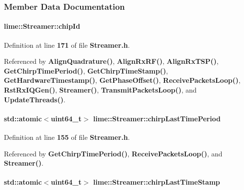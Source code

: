 \subsubsection{Member Data Documentation}
\paragraph[{chip\+Id}]{ lime\+::\+Streamer\+::chip\+Id\hspace{0.3cm}{\ttfamily [private]}}\label{classlime_1_1Streamer_abefd7afb714673aa37ebb56132571e7f}


Definition at line {\bf 171} of file {\bf Streamer.\+h}.



Referenced by {\bf Align\+Quadrature()}, {\bf Align\+Rx\+R\+F()}, {\bf Align\+Rx\+T\+S\+P()}, {\bf Get\+Chirp\+Time\+Period()}, {\bf Get\+Chirp\+Time\+Stamp()}, {\bf Get\+Hardware\+Timestamp()}, {\bf Get\+Phase\+Offset()}, {\bf Receive\+Packets\+Loop()}, {\bf Rst\+Rx\+I\+Q\+Gen()}, {\bf Streamer()}, {\bf Transmit\+Packets\+Loop()}, and {\bf Update\+Threads()}.

\paragraph[{chirp\+Last\+Time\+Period}]{\setlength{\rightskip}{0pt plus 5cm}std\+::atomic$<$uint64\+\_\+t$>$ lime\+::\+Streamer\+::chirp\+Last\+Time\+Period}\label{classlime_1_1Streamer_a274d6c62015f7ee03db9c9a0236fdc26}


Definition at line {\bf 155} of file {\bf Streamer.\+h}.



Referenced by {\bf Get\+Chirp\+Time\+Period()}, {\bf Receive\+Packets\+Loop()}, and {\bf Streamer()}.

\paragraph[{chirp\+Last\+Time\+Stamp}]{\setlength{\rightskip}{0pt plus 5cm}std\+::atomic$<$uint64\+\_\+t$>$ lime\+::\+Streamer\+::chirp\+Last\+Time\+Stamp}\label{classlime_1_1Streamer_a293a652cc85723793ad62f15d9baba56}


